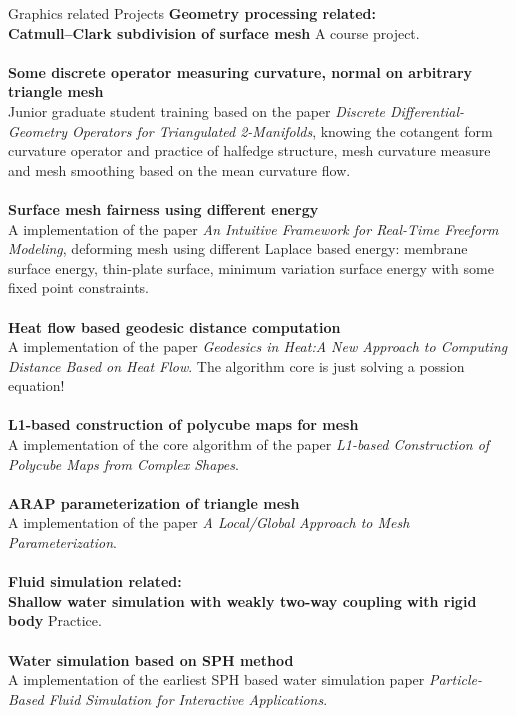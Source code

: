 \documentclass{resume} %
\begin{document}
\begin{rSection}{Graphics related Projects}
         \textbf{Geometry processing related:}\\
                {\bf Catmull–Clark subdivision of surface mesh} A course project.\\\\
                {\bf Some discrete operator measuring  curvature, normal on arbitrary triangle mesh}\\Junior graduate student training based on the paper \emph{Discrete Differential-Geometry Operators for Triangulated 2-Manifolds}, knowing the cotangent form curvature operator and practice of halfedge structure, mesh curvature measure and mesh smoothing based on the mean curvature flow.\\\\
                {\bf Surface mesh fairness using different energy}\\A implementation of the paper \emph{An Intuitive Framework for Real-Time Freeform Modeling}, deforming mesh using different Laplace based energy: membrane surface energy, thin-plate surface, minimum variation surface energy with some fixed point constraints.\\\\
                {\bf Heat flow based geodesic distance computation}\\A implementation of the paper \emph{Geodesics in Heat:A New Approach to Computing Distance Based on Heat Flow}. The algorithm core is just solving a possion equation!\\\\
                {\bf L1-based construction of polycube maps for mesh}\\ A implementation of the core algorithm of the paper \emph{L1-based Construction of Polycube Maps from Complex Shapes}.\\\\
                {\bf ARAP parameterization of triangle mesh}\\A implementation of the paper \emph{A Local/Global Approach to Mesh Parameterization}.\\\\
         \textbf{Fluid simulation related:}\\
                {\bf Shallow water simulation with weakly two-way coupling with rigid body} Practice.\\\\
                {\bf Water simulation based on SPH method}\\A implementation of the earliest SPH based water simulation paper \emph{Particle-Based Fluid Simulation for Interactive Applications}.\\\\                

\end{rSection}
\end{document}
